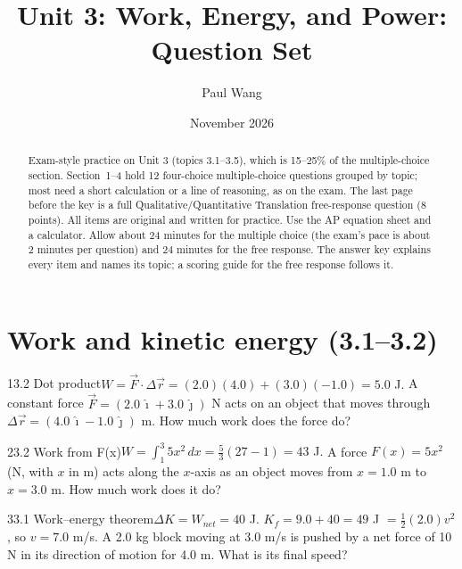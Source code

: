 \documentclass[11pt]{article}
\title{Unit 3: Work, Energy, and Power: Question Set}
\author{Paul Wang}
\date{November 2026}
\begin{document}
\maketitle

\begin{abstract}
Exam-style practice on Unit 3 (topics 3.1--3.5), which is 15--25\% of the multiple-choice section. Section~1--4 hold 12 four-choice multiple-choice questions grouped by topic; most need a short calculation or a line of reasoning, as on the exam. The last page before the key is a full Qualitative/Quantitative Translation free-response question (8 points). All items are original and written for practice. Use the AP equation sheet and a calculator. Allow about 24 minutes for the multiple choice (the exam's pace is about 2 minutes per question) and 24 minutes for the free response. The answer key explains every item and names its topic; a scoring guide for the free response follows it.
\end{abstract}


\section{Work and kinetic energy (3.1--3.2)}

\begin{q}{1}{3.2 Dot product}{$W = \vec F\cdot\Delta\vec r = (2.0)(4.0) + (3.0)(-1.0) = 5.0$ J.}
A constant force $\vec F = (2.0\,\hat\imath + 3.0\,\hat\jmath)$ N acts on an object that moves through $\Delta\vec r = (4.0\,\hat\imath - 1.0\,\hat\jmath)$ m. How much work does the force do?
\end{q}
\begin{q}{2}{3.2 Work from F(x)}{$W = \int_1^3 5x^2\,dx = \tfrac53(27 - 1) = 43$ J.}
A force $F(x) = 5x^2$ (N, with $x$ in m) acts along the $x$-axis as an object moves from $x = 1.0$ m to $x = 3.0$ m. How much work does it do?
\end{q}
\begin{q}{3}{3.1 Work--energy theorem}{$\Delta K = W_{net} = 40$ J. $K_f = 9.0 + 40 = 49$ J $= \tfrac12(2.0)v^2$, so $v = 7.0$ m/s.}
A 2.0 kg block moving at 3.0 m/s is pushed by a net force of 10 N in its direction of motion for 4.0 m. What is its final speed?
\end{q}
\end{document}
